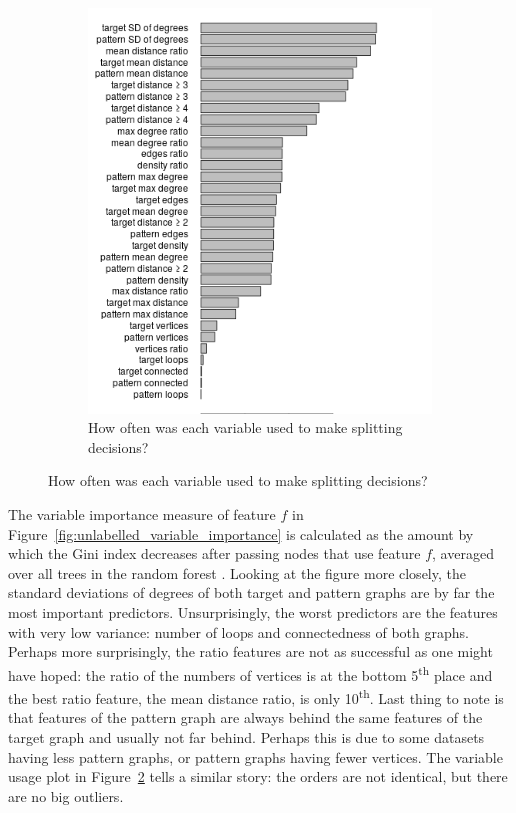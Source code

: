 \documentclass{l4proj}
\theoremstyle{definition}
\theoremstyle{remark}
\begin{document}
\begin{figure}
\begin{subfigure}[t]{0.45\textwidth}
    \includegraphics[width=\textwidth]{images/unlabelled_var_used.png}
    \caption{How often was each variable used to make splitting decisions?}
    \label{fig:unlabelled_var_used}
  \end{subfigure}
\end{figure}

The variable importance measure of feature $f$ in
Figure~\ref{fig:unlabelled_variable_importance} is calculated as the amount by
which the Gini index decreases after passing nodes that use feature $f$,
averaged over all trees in the random forest \cite{James:2014:ISL:2517747}.
Looking at the figure more closely, the standard deviations of degrees of both
target and pattern graphs are by far the most important predictors.
Unsurprisingly, the worst predictors are the features with very low variance:
number of loops and connectedness of both graphs. Perhaps more surprisingly, the
ratio features are not as successful as one might have hoped: the ratio of the
numbers of vertices is at the bottom 5\textsuperscript{th} place and the best
ratio feature, the mean distance ratio, is only 10\textsuperscript{th}. Last
thing to note is that features of the pattern graph are always behind the same
features of the target graph and usually not far behind. Perhaps this is due to
some datasets having less pattern graphs, or pattern graphs having fewer
vertices. The variable usage plot in Figure~\ref{fig:unlabelled_var_used} tells
a similar story: the orders are not identical, but there are no big outliers.
\end{document}
